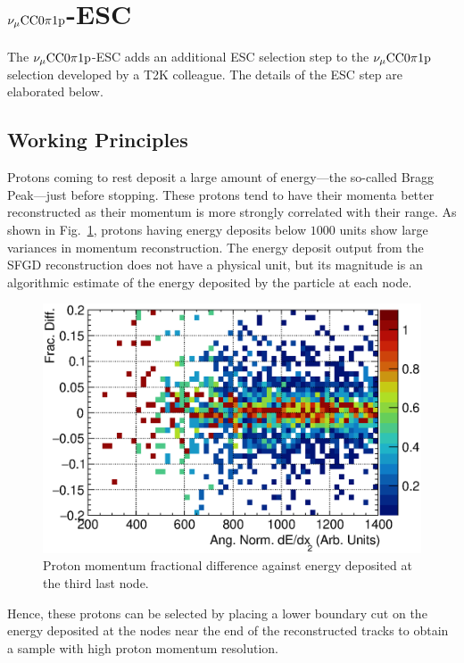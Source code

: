 \section{$\nu_{\mu}\textrm{CC}0\pi1\textrm{p}$-ESC}
\label{sec:sel-esc}
     The $\nu_{\mu}\textrm{CC}0\pi1\textrm{p}$-ESC adds an additional ESC selection step to the $\nu_{\mu}\textrm{CC}0\pi1\textrm{p}$ selection developed by a T2K colleague.
     The details of the ESC step are elaborated below.
    \subsection{Working Principles}
    \label{sec:sel-esc-wp}
     Protons coming to rest deposit a large amount of energy—the so-called Bragg Peak—just before stopping.
     These protons tend to have their momenta better reconstructed as their momentum is more strongly correlated with their range. 
     As shown in Fig.~\ref{fig:dedx-pprres-eg}, protons having energy deposits below $1000$ units show large variances in momentum reconstruction. 
     The energy deposit output from the SFGD reconstruction does not have a physical unit, but its magnitude is an algorithmic estimate of the energy deposited by the particle at each node.

    \begin{figure}[h]
        \centering
        \includegraphics[width=\sgfidwid\linewidth]{figures/sel/fig51.eps}
        \caption{Proton momentum fractional difference against energy deposited at the third last node.}
        \label{fig:dedx-pprres-eg}
    \end{figure}
     Hence, these protons can be selected by placing a lower boundary cut on the energy deposited at the nodes near the end of the reconstructed tracks to obtain a sample with high proton momentum resolution.   
    
